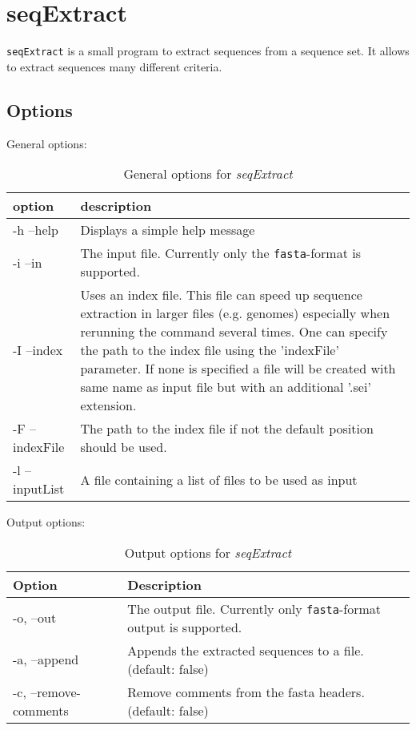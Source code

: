 \chapter{seqExtract}

\texttt{seqExtract} is a small program to extract sequences from a sequence set. It allows to extract sequences many different criteria.


\section{Options}
General options:

\begin{table}[H]
\caption{General options for \textit{seqExtract}}
\begin{tabular}{lp{12cm}}\hline
option & description\\
\hline
  -h --help & Displays a simple help message\\
  -i --in & The input file. Currently only the \texttt{fasta}-format is supported.\\
  -I --index &  Uses an index file. This file can speed up sequence extraction in larger files (e.g. genomes) especially when rerunning the command several times. One can specify the path to the index file using the 'indexFile' parameter. If none is specified a file will be created with same name as input file but with an additional '.sei' extension. \\
  -F --indexFile & The path to the index file if not the default position should be used.\\
  -l --inputList & A file containing a list of files to be used as input\\
  \hline
\end{tabular}
\end{table}






Output options:
\begin{table}[H]
\caption{Output options for \textit{seqExtract}}
\begin{tabular}{lp{12cm}}
\hline
Option & Description\\
\hline
  -o, --out & The output file. Currently only \texttt{fasta}-format output is supported.\\
  -a, --append &  Appends the extracted sequences to a file. (default: false)\\
  -c, --remove-comments &   Remove comments from the fasta headers. (default: false)\\
  \hline
\end{tabular}
\end{table}


